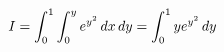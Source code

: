 \documentclass[preview]{standalone}
\begin{document}
\begin{align*}
\special{dvisvgm:raw <g id='unique000'>}I=\int_0^1\int_0^y e^{y^2}\,dx\,dy=\int_0^1y e^{y^2}\,dy\special{dvisvgm:raw </g>}
\end{align*}
\end{document}
